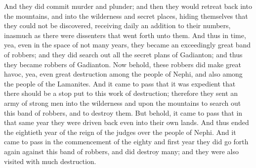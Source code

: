 And they did commit murder and plunder; and then they would retreat back into the mountains, and into the wilderness and secret places, hiding themselves that they could not be discovered, receiving daily an addition to their numbers, inasmuch as there were dissenters that went forth unto them.
\bverse \iffalse And thus in time, yea, even in the space of not many years, they became an exceedingly great band of robbers; and they did search out all the secret plans of Gadianton; and thus they became robbers of Gadianton. \fi
And thus in time, yea, even in the space of not many years, they became an exceedingly great band of robbers; and they did search out all the secret plans of Gadianton; and thus they became robbers of Gadianton.
\bverse \iffalse Now behold, these robbers did make great havoc, yea, even great destruction among the people of Nephi, and also among the people of the Lamanites. \fi
Now behold, these robbers did make great havoc, yea, even great destruction among the people of Nephi, and also among the people of the Lamanites.
\bverse \iffalse And it came to pass that it was expedient that there should be a stop put to this work of destruction; therefore they sent an army of strong men into the wilderness and upon the mountains to search out this band of robbers, and to destroy them. \fi
And it came to pass that it was expedient that there should be a stop put to this work of destruction; therefore they sent an army of strong men into the wilderness and upon the mountains to search out this band of robbers, and to destroy them.
\bverse \iffalse But behold, it came to pass that in that same year they were driven back even into their own lands. And thus ended the eightieth year of the reign of the judges over the people of Nephi. \fi
But behold, it came to pass that in that same year they were driven back even into their own lands. And thus ended the eightieth year of the reign of the judges over the people of Nephi.
\bverse \iffalse And it came to pass in the commencement of the eighty and first year they did go forth again against this band of robbers, and did destroy many; and they were also visited with much destruction. \fi
And it came to pass in the commencement of the eighty and first year they did go forth again against this band of robbers, and did destroy many; and they were also visited with much destruction.
\bverse \iffalse And they were again obliged to return out of the wilderness and out of the mountains unto their own lands, because of the exceeding greatness of the numbers of those robbers who infested the mountains and the wilderness. \fi
